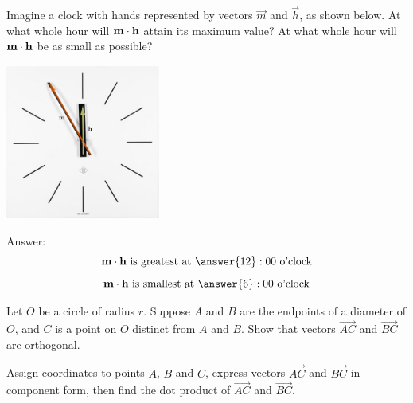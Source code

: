 \documentclass{ximera}
\begin{document}
\begin{problem}\label{prob:clockproblem}
 Imagine a clock with hands represented by vectors $\vec{m}$ and $\vec{h}$, as shown below.
At what whole hour will $\mathbf{m}\cdot\mathbf{h}$ attain its maximum value?  At what whole hour will $\mathbf{m}\cdot\mathbf{h}$ be as small as possible?

\begin{center}
\includegraphics[height=2in]{clockvectors.jpg}
\end{center}

Answer:$$\vec{m}\dotp\vec{h}\text{ is greatest at }\answer{12}:00 \text{ o'clock}$$
$$\vec{m}\dotp\vec{h}\text{ is smallest at }\answer{6}:00 \text{ o'clock}$$
\end{problem}

\begin{problem} \label{prob:righttriangleincircle}
Let $O$ be a circle of radius $r$.  Suppose $A$ and $B$ are the endpoints of a diameter of $O$, and $C$ is a point on $O$ distinct from $A$ and $B$. Show that vectors $\overrightarrow{AC}$ and $\overrightarrow{BC}$ are orthogonal.  

\begin{hint}
Assign coordinates to points $A$, $B$ and $C$, express vectors $\overrightarrow{AC}$ and $\overrightarrow{BC}$ in component form, then find the dot product of $\overrightarrow{AC}$ and $\overrightarrow{BC}$.
\end{hint}

\begin{center}
\end{center}
\end{problem}
\end{document}
